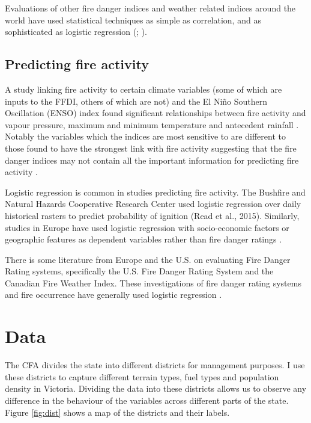 \documentclass[11pt,a4paper]{article}
\begin{document}
Evaluations of other fire danger indices and weather related indices around the world have used statistical techniques as simple as correlation, and as sophisticated as logistic regression (\cite{andrews03}; \cite{harris14}). 


\subsection{Predicting fire activity}
A study linking fire activity to certain climate variables (some of which are inputs to the FFDI, others of which are not) and the El Niño Southern Oscillation (ENSO) index found significant relationships between fire activity and vapour pressure, maximum and minimum temperature and antecedent rainfall \citep{harris14}. Notably the variables which the indices are most sensitive to are different to those found to have the strongest link with fire activity suggesting that the fire danger indices may not contain all the important information for predicting fire activity \citep{harris14}. 

Logistic regression is common in studies predicting fire activity. The Bushfire and Natural Hazards Cooperative Research Center used logistic regression over daily historical rasters to predict probability of ignition (Read et al., 2015). Similarly, studies in Europe have used logistic regression with socio-economic factors or geographic features as dependent variables rather than fire danger ratings \citep{del11, zhang13}. 

There is some literature from Europe and the U.S. on evaluating Fire Danger Rating systems, specifically the U.S. Fire Danger Rating System and the Canadian Fire Weather Index.  These investigations of fire danger rating systems and fire occurrence have  generally used logistic regression \citep{andrews03, padilla11}. 

\section{Data}

The CFA divides the state into different districts for management purposes. I use these districts to capture different terrain types, fuel types and population density in Victoria. Dividing the data into these districts allows us to observe any difference in the behaviour of the variables across different parts of the state. Figure \ref{fig:dist} shows a map of the districts and their labels. 
\end{document}
